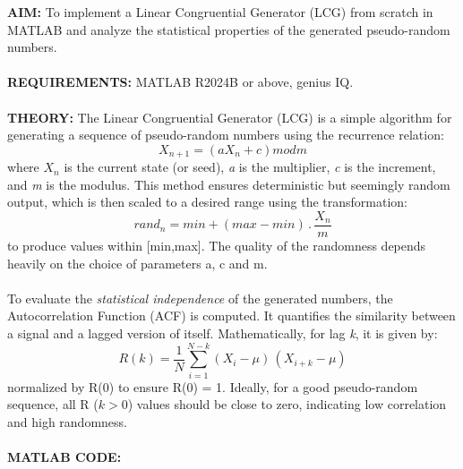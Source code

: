 \documentclass[12pt]{report}
\begin{document}
  \noindent \textbf{AIM:} To implement a Linear Congruential Generator (LCG) from scratch in MATLAB and analyze the statistical properties of the generated pseudo-random numbers. \\ \\
  \textbf{REQUIREMENTS:} MATLAB R2024B or above, genius IQ. \\ \\
  \textbf{THEORY:} The Linear Congruential Generator (LCG) is a simple algorithm for generating a sequence of pseudo-random numbers using the recurrence relation: \[ X_{n+1} = (a X_n + c) mod {m} \] where $X_n$ is the current state (or seed), \textit{a} is the multiplier, \textit{c} is the increment, and \textit{m} is the modulus. This method ensures deterministic but seemingly random output, which is then scaled to a desired range using the transformation: \[ rand_n = min + (max - min) \, . \, \frac{X_n}{m} \] to produce values within [min,max]. The quality of the randomness depends heavily on the choice of parameters a, c and m.\cite{chatgpt} \\ \\ To evaluate the \textit{statistical independence} of the generated numbers, the Autocorrelation Function (ACF) is computed. It quantifies the similarity between a signal and a lagged version of itself. Mathematically, for lag \textit{k}, it is given by: \[ R(k) = \frac{1}{N} \sum_{i = 1}^{N - k} (X_i - \mu) \, (X_{i+k} - \mu) \] normalized by R(0) to ensure R(0) = 1. Ideally, for a good pseudo-random sequence, all R ($k>0$) values should be close to zero, indicating low correlation and high randomness. \cite{profnotes} \\ \\
  \textbf{MATLAB CODE:}
\end{document}
